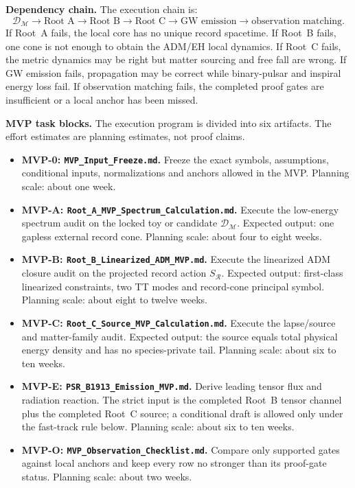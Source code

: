 \documentclass[11pt]{article}
\begin{document}
\medskip\noindent\textbf{Dependency chain.}
The execution chain is:
\[
\boxed{
\mathcal D_{\mathcal M}
\to \text{Root A}
\to \text{Root B}
\to \text{Root C}
\to \text{GW emission}
\to \text{observation matching}.
}
\]
If Root~A fails, the local core has no unique record spacetime.  If Root~B
fails, one cone is not enough to obtain the ADM/EH local dynamics.  If Root~C
fails, the metric dynamics may be right but matter sourcing and free fall are
wrong.  If GW emission fails, propagation may be correct while binary-pulsar
and inspiral energy loss fail.  If observation matching fails, the completed
proof gates are insufficient or a local anchor has been missed.

\medskip\noindent\textbf{MVP task blocks.}
The execution program is divided into six artifacts.  The effort estimates are
planning estimates, not proof claims.
\begin{itemize}
\item \textbf{MVP-0: \texttt{MVP\_Input\_Freeze.md}.}  Freeze the exact
  symbols, assumptions, conditional inputs, normalizations and anchors allowed
  in the MVP.  Planning scale: about one week.
\item \textbf{MVP-A: \texttt{Root\_A\_MVP\_Spectrum\_Calculation.md}.}
  Execute the low-energy spectrum audit on the locked toy or candidate
  \(\mathcal D_{\mathcal M}\).  Expected output: one gapless external record
  cone.  Planning scale: about four to eight weeks.
\item \textbf{MVP-B: \texttt{Root\_B\_Linearized\_ADM\_MVP.md}.}  Execute
  the linearized ADM closure audit on the projected record action
  \(S_{\mathcal R}\).  Expected output: first-class linearized constraints,
  two TT modes and record-cone principal symbol.  Planning scale: about
  eight to twelve weeks.
\item \textbf{MVP-C: \texttt{Root\_C\_Source\_MVP\_Calculation.md}.}
  Execute the lapse/source and matter-family audit.  Expected output: the
  source equals total physical energy density and has no species-private tail.
  Planning scale: about six to ten weeks.
\item \textbf{MVP-E: \texttt{PSR\_B1913\_Emission\_MVP.md}.}  Derive leading
  tensor flux and radiation reaction.  The strict input is the completed
  Root~B tensor channel plus the completed Root~C source; a conditional draft
  is allowed only under the fast-track rule below.  Planning scale: about
  six to ten weeks.
\item \textbf{MVP-O: \texttt{MVP\_Observation\_Checklist.md}.}  Compare only
  supported gates against local anchors and keep every row no stronger than
  its proof-gate status.  Planning scale: about two weeks.
\end{itemize}
\end{document}
